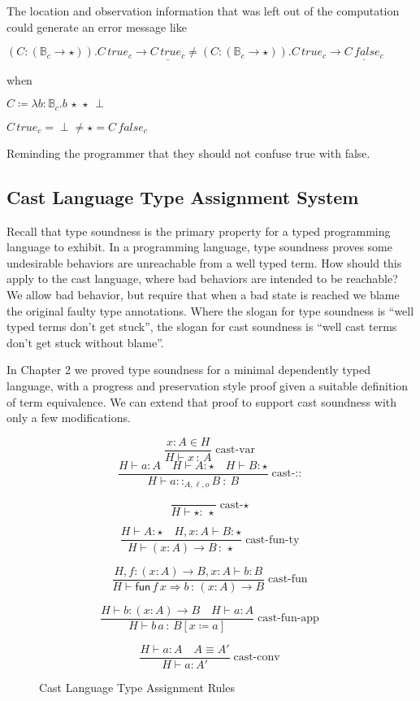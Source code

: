 The location and observation information that was left out of the
computation could generate an error message like

$\left(C:\left(\mathbb{B}_{c}\rightarrow\star\right)\right).C\,true_{c}\rightarrow\underline{C\,true_{c}}\neq\left(C:\left(\mathbb{B}_{c}\rightarrow\star\right)\right).C\,true_{c}\rightarrow\underline{C\,false_{c}}$

when 

$C\coloneqq\lambda b:\mathbb{B}_{c}.b\,\star\,\star\,\perp$

$C\,true_{c}=\perp\neq\star=C\,false_{c}$

Reminding the programmer that they should not confuse true with false.

\subsection{Cast Language Type Assignment System}


Recall that type soundness is the primary property for a typed programming
language to exhibit. In a programming language, type soundness proves
some undesirable behaviors are unreachable from a well typed term.
How should this apply to the cast language, where bad behaviors are
intended to be reachable? We allow bad behavior, but require that
when a bad state is reached we blame the original faulty type annotations.
Where the slogan for type soundness is ``well typed terms don't get
stuck'', the slogan for cast soundness is ``well cast terms don't
get stuck without blame''.

In Chapter 2 we proved type soundness for a minimal dependently typed
language, with a progress and preservation style proof given a suitable
definition of term equivalence. We can extend that proof to support
cast soundness with only a few modifications.

\begin{figure}
\[
\frac{x:A\in H}{H\vdash x\,:\,A}\operatorname{cast-var}
\]
\[
\frac{H\vdash a:A\quad H\vdash A:\star\quad H\vdash B:\star}{H\vdash a::_{A,\ensuremath{\ell},o}B\::\:B}\operatorname{cast-::}
\]

\[
\frac{\,}{H\vdash\star:\,\star}\operatorname{cast-\star}
\]

\[
\frac{H\vdash A:\star\quad H,x:A\vdash B:\star}{H\vdash\left(x:A\right)\rightarrow B\,:\,\star}\operatorname{cast-fun-ty}
\]

\[
\frac{H,f:\left(x:A\right)\rightarrow B,x:A\vdash b:B}{H\vdash\mathsf{fun}\,f\,x\Rightarrow b\,:\,\left(x:A\right)\rightarrow B}\operatorname{cast-fun}
\]

\[
\frac{H\vdash b:\left(x:A\right)\rightarrow B\quad H\vdash a:A}{H\vdash b\,a\,:\,B\left[x\coloneqq a\right]}\operatorname{cast-fun-app}
\]

\[
\frac{H\vdash a:A\quad A\equiv A'}{H\vdash a:A'}\operatorname{cast-conv}
\]


\caption{Cast Language Type Assignment Rules}
\label{fig:cast-tas-rules}
\end{figure}

